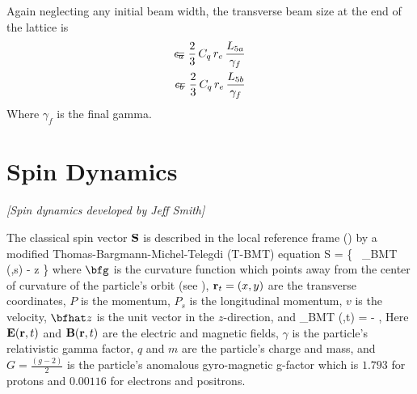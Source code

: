 Again neglecting any initial beam width, the transverse beam size
at the end of the lattice is
  \begin{align}
    \epsilon_a \AND= \frac{2}{3} \, C_q \, r_e \, 
    \frac{L_{5a}}{\gamma_f} \CRNO
    \epsilon_b \AND= \frac{2}{3} \, C_q \, r_e \, 
    \frac{L_{5b}}{\gamma_f} 
  \end{align}
Where $\gamma_f$ is the final gamma.

\section{Spin Dynamics}   
\label{s:spin.dyn}   

\textit{\large [Spin dynamics developed by Jeff Smith]}

The classical spin vector ${\bf S}$ is described in the   
local reference frame () by a
modified Thomas-Bargmann-Michel-Telegdi (T-BMT) equation\cite{b:spin}
\Begineq
   \Bf S = 
  \left\{  \, 
  {\pmb\Omega}_{BMT} (,s) - \bfg \times \bfhat z \right\} \times {}
\Endeq
where $\bfg$ is the curvature function which points away from the
center of curvature of the particle's orbit (see
), ${\bf r}_t = (x, y)$ are the transverse
coordinates, $P$ is the momentum, $P_s$ is the longitudinal momentum,
$v$ is the velocity, $\bfhat z$ is the unit vector in the
$z$-direction, and
\Begineq
  {\pmb\Omega}_{BMT} (,t) = -  ,   
\Endeq  
Here ${\bf E} ({\bf r} ,t)$ and ${\bf B} ({\bf r} ,t)$ are the electric and
magnetic fields, $\gamma$ is the particle's relativistic gamma factor,
$q$ and $m$ are the particle's charge and mass, and $G =
\frac{\left(g-2\right)}{2}$ is the particle's anomalous gyro-magnetic
g-factor which is $1.793$ for protons and $0.00116$ for electrons and
positrons.
   
